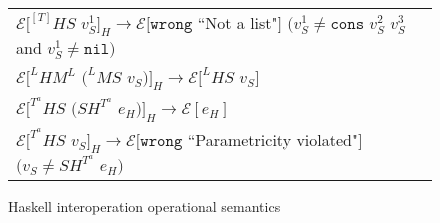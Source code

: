 \begin{figure}[ph!]
\begin{tabular}{l}
\vspace{5pt}

$\mathscr{E}[^{[T]}HS$ $v_{S}^{1}]_{H}\rightarrow\mathscr{E}[\mathtt{wrong}$ ``Not a list"$]$ $(v_{S}^{1}\neq\mathtt{cons}$ $v_{S}^{2}$ $v_{S}^{3}$ and $v_{S}^{1}\neq\mathtt{nil})$ \\

\vspace{5pt}

$\mathscr{E}[^{L}HM^{L}$ $(^{L}MS$ $v_{S})]_{H}\rightarrow\mathscr{E}[^{L}HS$ $v_{S}]$ \\

\vspace{5pt}

$\mathscr{E}[^{T^{a}}HS$ $(SH^{T^{a}}$ $e_{H})]_{H}\rightarrow\mathscr{E}[e_{H}]$ \\

\vspace{5pt}

$\mathscr{E}[^{T^{a}}HS$ $v_{S}]_{H}\rightarrow\mathscr{E}[\mathtt{wrong}$ ``Parametricity violated"$]$ $(v_{S}\neq SH^{T^{a}}$ $e_{H})$ \\
\end{tabular}
\caption{Haskell interoperation operational semantics}
\label{hios}
\end{figure}